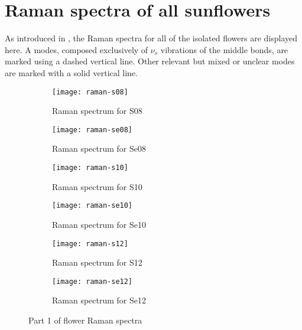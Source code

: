 \newpage
\section{Raman spectra of all sunflowers}

As introduced in , the Raman spectra for all of the isolated flowers are displayed here.
A modes, composed exclusively of $\nu_s$ vibrations of the middle bonds, are marked using a dashed vertical line.
Other relevant but mixed or unclear modes are marked with a solid vertical line.

\begin{figure*}[h]
\centering
\begin{subfigure}{8.25cm}\centering\texttt{[image: raman-s08]}\caption{Raman spectrum for S08}\end{subfigure}%
\begin{subfigure}{8.25cm}\centering\texttt{[image: raman-se08]}\caption{Raman spectrum for Se08}\end{subfigure}
\begin{subfigure}{8.25cm}\centering\texttt{[image: raman-s10]}\caption{Raman spectrum for S10}\end{subfigure}%
\begin{subfigure}{8.25cm}\centering\texttt{[image: raman-se10]}\caption{Raman spectrum for Se10}\end{subfigure}
\begin{subfigure}{8.25cm}\centering\texttt{[image: raman-s12]}\caption{Raman spectrum for S12}\end{subfigure}%
\begin{subfigure}{8.25cm}\centering\texttt{[image: raman-se12]}\caption{Raman spectrum for Se12}\end{subfigure}
\caption[Part 1 of flower Raman spectra]{Part 1 of flower Raman spectra}
\end{figure*}

\newpage

